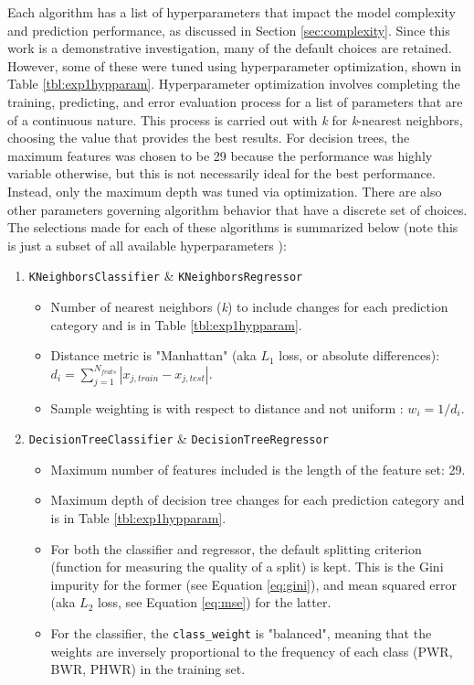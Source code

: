 Each algorithm has a list of hyperparameters that impact the model complexity
and prediction performance, as discussed in Section \ref{sec:complexity}. Since
this work is a demonstrative investigation, many of the default choices are
retained. However, some of these were tuned using hyperparameter optimization,
shown in Table \ref{tbl:exp1hypparam}.  Hyperparameter optimization involves
completing the training, predicting, and error evaluation process for a list of
parameters that are of a continuous nature.  This process is carried out with
\textit{k} for \textit{k}-nearest neighbors, choosing the value that provides
the best results. For decision trees, the maximum features was chosen to be 29
because the performance was highly variable otherwise, but this is not
necessarily ideal for the best performance. Instead, only the maximum depth was
tuned via optimization.  There are also other parameters governing algorithm
behavior that have a discrete set of choices.  The selections made for each of
these algorithms is summarized below (note this is just a subset of all
available hyperparameters \cite{scikit}):
\begin{enumerate}
  \item \texttt{KNeighborsClassifier} \& \texttt{KNeighborsRegressor}
    \begin{itemize}
      \item Number of nearest neighbors (\textit{k}) to include changes for 
            each prediction category and is in Table \ref{tbl:exp1hypparam}.
      \item Distance metric is "Manhattan" (aka $L_1$ loss, or absolute 
            differences): $d_i = \sum_{j=1}^{N_{feats}} 
            |x_{j,train} - x_{j,test}|$.
      \item Sample weighting is with respect to distance and not uniform : 
            $w_i = 1/d_i$.
    \end{itemize}
  \item \texttt{DecisionTreeClassifier} \& \texttt{DecisionTreeRegressor}
    \begin{itemize}
      \item Maximum number of features included is the length of the feature 
            set: 29.
      \item Maximum depth of decision tree changes for each prediction category
            and is in Table \ref{tbl:exp1hypparam}.
      \item For both the classifier and regressor, the default splitting 
            criterion (function for measuring the quality of a split) is kept.
            This is the Gini impurity for the former (see Equation 
            \ref{eq:gini}), and mean squared error (aka $L_2$ loss, see 
            Equation \ref{eq:mse}) for the latter.
      \item For the classifier, the \texttt{class\_weight} is "balanced", 
            meaning that the weights are inversely proportional to the frequency
            of each class (\gls{PWR}, \gls{BWR}, \gls{PHWR}) in the training set.
    \end{itemize}
\end{enumerate}

